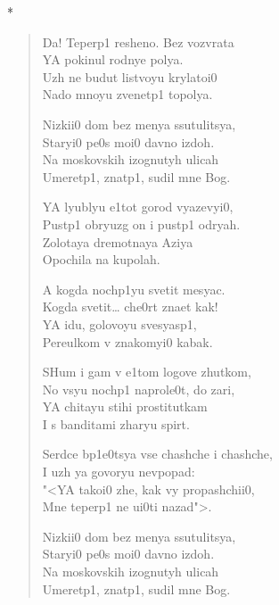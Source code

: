 \documentclass[russian,english]{book}
\begin{document}
\pagestyle{empty}

\centerline{*\quad*\quad*}
\begin{verse}%
Da! Teperp1 resheno. Bez vozvrata\\
YA pokinul rodnye polya.\\
Uzh ne budut listvoyu krylatoi0\\
Nado mnoyu zvenetp1 topolya.
\bigskip

Nizkii0 dom bez menya ssutulit{}sya,\\
Staryi0 pe0s moi0 davno izdoh.\\
Na moskovskih izognutyh ulicah\\
Umeretp1, znatp1, sudil mne Bog.
\bigskip

YA lyublyu e1tot gorod vyazevyi0,\\
Pustp1 obryuzg on i pustp1 odryah.\\
Zolotaya dremotnaya Aziya\\
Opochila na kupolah.
\bigskip

A kogda nochp1yu svetit mesyac.\\
Kogda svetit\ldots{} che0rt znaet kak!\\
YA idu, golovoyu svesyasp1,\\
Pereulkom v znakomyi0 kabak.
\bigskip

SHum i gam v e1tom logove zhutkom,\\
No vsyu nochp1 naprole0t, do zari,\\
YA chitayu stihi prostitutkam\\
I s banditami zharyu spirt.
\bigskip

Serdce bp1e0t{}sya vse chashche i chashche,\\
I uzh ya govoryu nevpopad:\\
"<YA takoi0 zhe, kak vy propashchii0,\\
Mne teperp1 ne ui0ti nazad">.
\bigskip

Nizkii0 dom bez menya ssutulit{}sya,\\
Staryi0 pe0s moi0 davno izdoh.\\
Na moskovskih izognutyh ulicah\\
Umeretp1, znatp1, sudil mne Bog.
\bigskip

\end{verse}

\newpage
{}\selectfont
\end{document}
